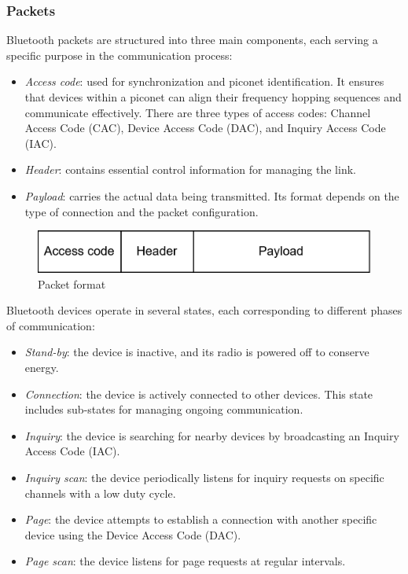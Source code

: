 \subsubsection{Packets}
Bluetooth packets are structured into three main components, each serving a specific purpose in the communication process:
\begin{itemize}
    \item \textit{Access code}: used for synchronization and piconet identification. 
        It ensures that devices within a piconet can align their frequency hopping sequences and communicate effectively.
        There are three types of access codes: Channel Access Code (CAC), Device Access Code (DAC), and Inquiry Access Code (IAC).
    \item \textit{Header}: contains essential control information for managing the link. 
    \item \textit{Payload}: carries the actual data being transmitted. 
        Its format depends on the type of connection and the packet configuration.
\end{itemize}
\begin{figure}[H]
    \centering
    \includegraphics[width=0.5\linewidth]{images/iot19.png}
    \caption{Packet format}
\end{figure}
\noindent Bluetooth devices operate in several states, each corresponding to different phases of communication:
\begin{itemize}
    \item \textit{Stand-by}: the device is inactive, and its radio is powered off to conserve energy.
    \item \textit{Connection}: the device is actively connected to other devices. This state includes sub-states for managing ongoing communication.
    \item \textit{Inquiry}: the device is searching for nearby devices by broadcasting an Inquiry Access Code (IAC).
    \item \textit{Inquiry scan}: the device periodically listens for inquiry requests on specific channels with a low duty cycle.
    \item \textit{Page}: the device attempts to establish a connection with another specific device using the Device Access Code (DAC).
    \item \textit{Page scan}: the device listens for page requests at regular intervals.
\end{itemize}

